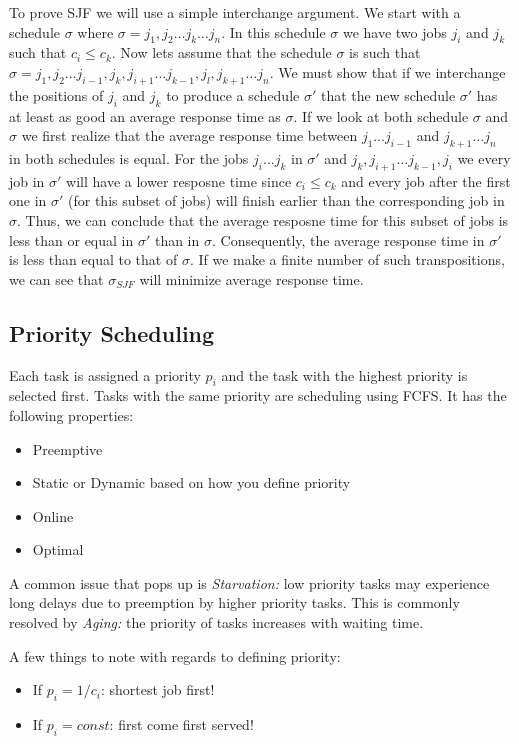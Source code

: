 \documentclass{hw}
\begin{document}
To prove SJF we will use a simple interchange argument. We start with a
schedule $\sigma$ where $\sigma = {j_1, j_2 \dots j_k \dots j_n}.$ In this
schedule $\sigma$ we have two jobs $j_i$ and $j_k$ such that $c_i \leq c_k$.
Now lets assume that the schedule $\sigma$ is such that $\sigma = {j_1, j_2
\dots j_{i-1}, j_k, j_{i+1} \dots j_{k-1}, j_l, j_{k+1} \dots j_n}$. We must
  show that if we interchange the positions of $j_i$ and $j_k$ to produce a
  schedule $\sigma '$ that the new schedule $\sigma '$ has at least as good an
  average response time as $\sigma$. If we look at both schedule $\sigma$ and
  $\sigma$ we first realize that the average response time between $j_1 \dots
  j_{i-1}$ and $j_{k+1} \dots j_n$ in both schedules is equal. For the jobs
  $j_i \dots j_k$ in $\sigma '$ and $j_k, j_{i+1} \dots j_{k-1}, j_i$ we every
  job in $\sigma '$ will have a lower resposne time since $c_i \leq c_k$ and
  every job after the first one in $\sigma '$ (for this subset of jobs) will
  finish earlier than the corresponding job in $\sigma$. Thus, we can conclude
  that the average resposne time for this subset of jobs is less than or equal
  in $\sigma '$ than in $\sigma$. Consequently, the average response time in
  $\sigma '$ is less than equal to that of $\sigma$. If we make a finite number
  of such transpositions, we can see that $\sigma_{SJF}$ will minimize average
  response time.


\subsection{Priority Scheduling}
Each task is assigned a priority $p_{i}$ and the task with the highest priority
is selected first. Tasks with the same priority are scheduling using FCFS. It has
the following properties:
\begin{itemize}
  \item Preemptive
  \item Static or Dynamic based on how you define priority
  \item Online
  \item Optimal
\end{itemize}
A common issue that pops up is \emph{Starvation:} low priority tasks may 
experience long delays due to preemption by higher priority tasks. This is 
commonly resolved by \emph{Aging:} the priority of tasks increases with waiting
time.

A few things to note with regards to defining priority:
\begin{itemize}
  \item If $p_{i} = 1/c_{i}$: shortest job first!
  \item If $p_{i} = const$: first come first served!
\end{itemize}
\end{document}
